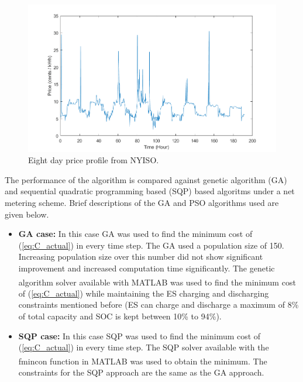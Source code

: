 \begin{figure}[!ht]
    \centering
    \includegraphics[width = \linewidth]{figs/RTP_NY.png}
    \caption{Eight day price profile from NYISO.}
    \label{fig:RTP_PROFILE_NY}
\end{figure}

The performance of the algorithm is compared against genetic algorithm (GA) and sequential quadratic programming based (SQP) based algoritms under a net metering scheme. Brief descriptions of the GA and PSO algorithms used are given below.
\begin{itemize}
    \item \textbf{GA case:} In this case GA was used to find the minimum cost of (\ref{eq:C_actual}) in every time step. The GA used a population size of 150. Increasing population size over this number did not show significant improvement and increased computation time significantly. The genetic algorithm solver available with MATLAB\textsuperscript{\textregistered} \cite{GA} was used to find the minimum cost of  (\ref{eq:C_actual}) while maintaining the ES charging and discharging constraints mentioned before (ES can charge and discharge a maximum of 8\% of total capacity and SOC is kept between 10\% to 94\%).
    
    \item \textbf{SQP case:} In this case SQP was used to find the minimum cost of (\ref{eq:C_actual}) in every time step. The SQP solver available with the fmincon function in  MATLAB\textsuperscript{\textregistered} \cite{SQP} was used to obtain the minimum. The constraints for the SQP approach are the same as the GA approach.

\end{itemize}

